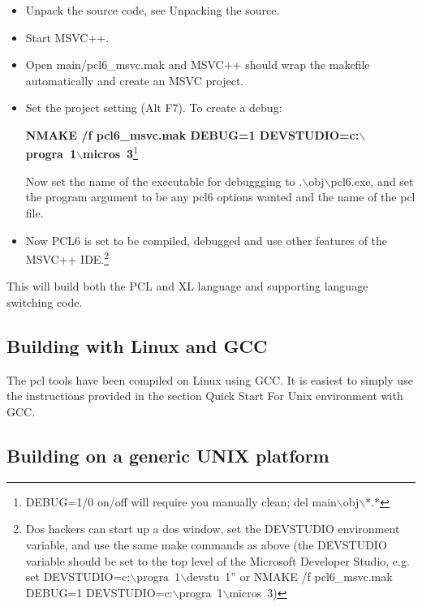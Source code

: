 \documentclass[10pt]{article}
\begin{document}
\begin{itemize}
\item  Unpack the source code, see Unpacking the source.

\item  Start MSVC++.
  
\item Open main/pcl6\_msvc.mak and MSVC++ should wrap the makefile
  automatically and create an MSVC project.
  
\item Set the project setting (Alt F7).  To create a debug:
  
  \textbf{NMAKE /f pcl6\_msvc.mak DEBUG=1
    DEVSTUDIO=c:$\backslash$progra~1$\backslash$micros~3}\footnote{DEBUG=1/0
    on/off will require you manually clean; del
    main$\backslash$obj$\backslash$*.*}
  
  Now set the name of the executable for debuggging to
  $.$$\backslash$obj$\backslash$pcl6.exe, and set the program argument
  to be any pcl6 options wanted and the name of the pcl file.

\item Now PCL6 is set to be compiled, debugged and use other features
  of the MSVC++ IDE.\footnote{Dos hackers can start up a dos window,
    set the DEVSTUDIO environment variable, and use the same make
    commands as above (the DEVSTUDIO variable should be set to the top
    level of the Microsoft Developer Studio, e.g. set
    DEVSTUDIO=c:$\backslash$progra~1$\backslash$devstu~1'' or NMAKE /f
    pcl6\_msvc.mak DEBUG=1
    DEVSTUDIO=c:$\backslash$progra~1$\backslash$micros~3)}

\end{itemize}

This will build both the PCL and XL language and supporting language
switching code.

\subsection*{Building with Linux and GCC}

The pcl tools have been compiled on Linux using GCC. It is easiest to
simply use the instructions provided in the section Quick Start For
Unix environment with GCC.

\subsection*{Building on a generic UNIX platform}
\end{document}
